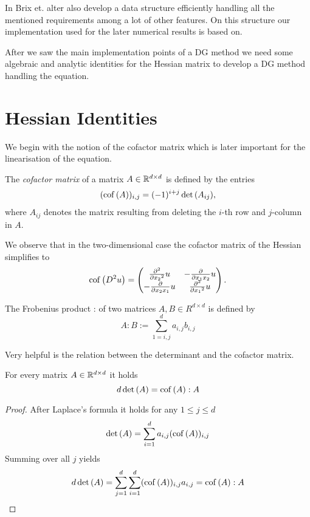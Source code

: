 \begin{definition} 
In \cite{BMV2009} Brix et. alter also develop a data structure efficiently handling all the mentioned requirements among a lot of other features. On this structure our implementation used for the later numerical results is based on.

After we saw the main implementation points of a DG method we need some algebraic and analytic identities for the Hessian matrix to develop a DG method handling the \MA equation.
\section{Hessian Identities}

We begin with the notion of the cofactor matrix which is later important for the linearisation of the \MA equation.
\begin{definition} \label{def: cof matrix}
	The \emph{cofactor matrix} of a matrix $A \in \mathbb{R}^{d \times d}$ is defined by the entries
	\begin{align}
	(\operatorname{cof} \left( A \right) )_{i,j} = (-1)^{i+j} \det{\left(A_{ij}\right)},
	\end{align}
	where $A_{ij}$ denotes the matrix resulting from deleting the $i$-th row and $j$-column in $A$.
\end{definition}

We observe that in the two-dimensional case the cofactor matrix of the Hessian simplifies to
\begin{align}
\operatorname{cof} \left( D^2 u \right) = \begin{pmatrix}
								\frac {\partial^2} {\partial {x_2}^2} u & -\frac {\partial }{\partial x_1 x_2} u\\
								-\frac {\partial }{\partial x_2 x_1} u & \frac {\partial^2} {\partial {x_1}^2} u
							\end{pmatrix}.
\end{align}

\begin{definition}
	The Frobenius product : of two matrices $A, B \in R^{d \times d}$ is defined by
	\[
		A:B := \sum_{1 = i,j} ^d a_{i,j} b_{i,j}
	\]
\end{definition}

Very helpful is the relation between the determinant and the cofactor matrix.
\begin{lemma}\label{la: rel det cofactor}
	For every matrix $A  \in \mathbb{R}^{d \times d}$ it holds
	\[
		d \det{\left(A\right)} = \operatorname{cof} \left( A \right): A
	\]
\end{lemma}
\begin{proof}
	After Laplace's formula it holds for any $1 \leq j \leq d$
	\[
		\det{\left(A\right)} = \sum\limits_{i = 1}^{d} a_{i,j} (\operatorname{cof} \left( A \right) )_{i,j} 
	\]
	Summing over all $j$ yields
	\[
		d \det{\left(A\right)} = \sum\limits_{j= 1}^{d} \sum\limits_{i = 1}^{d} (\operatorname{cof} \left( A \right) )_{i,j}  a_{i,j}  = \operatorname{cof} \left( A \right): A
	\]
\end{proof}


\end{definition}
